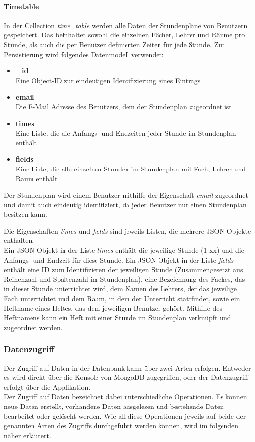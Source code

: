 \paragraph{Timetable}
In der Collection \textit{time\_table} werden alle Daten der Stundenpläne von Benutzern gespeichert. Das beinhaltet sowohl die einzelnen Fächer, Lehrer und Räume pro Stunde, als auch die per Benutzer definierten Zeiten für jede Stunde. Zur Persistierung wird folgendes Datenmodell verwendet:
\begin{itemize}
\item \textbf{\_id}\\ Eine Object-ID zur eindeutigen Identifizierung eines Eintrags
\item \textbf{email}\\ Die E-Mail Adresse des Benutzers, dem der Stundenplan zugeordnet ist
\item \textbf{times}\\ Eine Liste, die die Anfangs- und Endzeiten jeder Stunde im Stundenplan enthält
\item \textbf{fields}\\ Eine Liste, die alle einzelnen Stunden im Stundenplan mit Fach, Lehrer und Raum enthält
\end{itemize}
Der Stundenplan wird einem Benutzer mithilfe der Eigenschaft \textit{email} zugeordnet und damit auch eindeutig identifiziert, da jeder Benutzer nur einen Stundenplan besitzen kann. 

Die Eigenschaften \textit{times} und \textit{fields} sind jeweils Listen, die mehrere JSON-Objekte enthalten.\\
Ein JSON-Objekt in der Liste \textit{times} enthält die jeweilige Stunde (1-xx) und die Anfangs- und Endzeit für diese Stunde. Ein JSON-Objekt in der Liste \textit{fields} enthält eine ID zum Identifizieren der jeweiligen Stunde (Zusammengesetzt aus Reihenzahl und Spaltenzahl im Stundenplan), eine Bezeichnung des Faches, das in dieser Stunde unterrichtet wird, dem Namen des Lehrers, der das jeweilige Fach unterrichtet und dem Raum, in dem der Unterricht stattfindet, sowie ein Heftname eines Heftes, das dem jeweiligen Benutzer gehört. Mithilfe des Heftnamens kann ein Heft mit einer Stunde im Stundenplan verknüpft und zugeordnet werden.

\subsubsection{Datenzugriff}
Der Zugriff auf Daten in der Datenbank kann über zwei Arten erfolgen. Entweder es wird direkt über die Konsole von MongoDB zugegriffen, oder der Datenzugriff erfolgt über die Applikation. \\
Der Zugriff auf Daten bezeichnet dabei unterschiedliche Operationen. Es können neue Daten erstellt, vorhandene Daten ausgelesen und bestehende Daten bearbeitet oder gelöscht werden. Wie all diese Operationen jeweils auf beide der genannten Arten des Zugriffs durchgeführt werden können, wird im folgenden näher erläutert.
